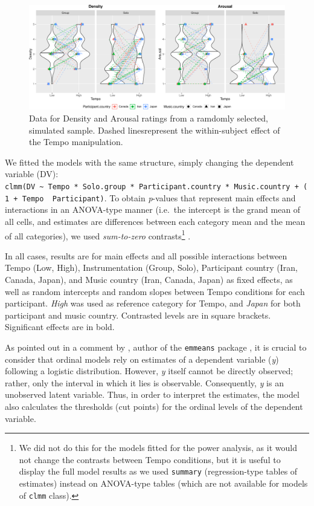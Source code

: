 \documentclass[
  bookmarksnumbered]{article}
\begin{document}
\begin{figure}
\centering
\includegraphics{Power_analysis_files/figure-latex/unnamed-chunk-17-1.pdf}
\caption{\label{fig:unnamed-chunk-17}Data for Density and Arousal ratings from a ramdomly selected, simulated sample. Dashed linesrepresent the within-subject effect of the Tempo manipulation.}
\end{figure}

We fitted the models with the same structure, simply changing the dependent variable (DV): \texttt{clmm(DV\ \textasciitilde{}\ Tempo\ *\ Solo.group\ *\ Participant.country\ *\ Music.country\ +\ (1\ +\ Tempo\ \textbar{}\ Participant)}. To obtain \emph{p}-values that represent main effects and interactions in an ANOVA-type manner (i.e.~the intercept is the grand mean of all cells, and estimates are differences between each category mean and the mean of all categories), we used \emph{sum-to-zero} contrasts\footnote{We did not do this for the models fitted for the power analysis, as it would not change the contrasts between Tempo conditions, but it is useful to display the full model results as we used \texttt{summary} (regression-type tables of estimates) instead on ANOVA-type tables (which are not available for models of \texttt{clmm} class).} \autocites[see e.g.,][]{kaufmanContrastCodingLeast1974,keppelDataAnalysisResearch1989}.

In all cases, results are for main effects and all possible interactions between Tempo (Low, High), Instrumentation (Group, Solo), Participant country (Iran, Canada, Japan), and Music country (Iran, Canada, Japan) as fixed effects, as well as random intercepts and random slopes between Tempo conditions for each participant. \emph{High} was used as reference category for Tempo, and \emph{Japan} for both participant and music country. Contrasted levels are in square brackets. Significant effects are in bold.

As pointed out in a comment by \textcite{532079}, author of the \texttt{emmeans} package \autocite*{emmeanscit}, it is crucial to consider that ordinal models rely on estimates of a dependent variable (\emph{y}) following a logistic distribution. However, \emph{y} itself cannot be directly observed; rather, only the interval in which it lies is observable. Consequently, \emph{y} is an unobserved latent variable. Thus, in order to interpret the estimates, the model also calculates the thresholds (cut points) for the ordinal levels of the dependent variable.
\end{document}
